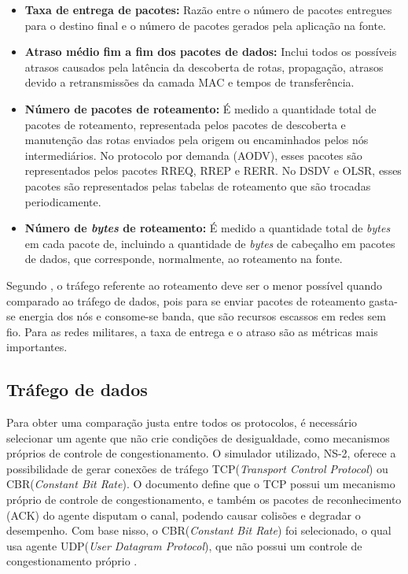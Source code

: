 \begin{itemize}
	\item \textbf{Taxa de entrega de pacotes:} Raz\~ao entre o n\'umero de pacotes entregues para o destino final e o n\'umero de pacotes gerados pela aplica\c{c}\~ao na fonte.
	\item \textbf{Atraso m\'edio fim a fim dos pacotes de dados:} Inclui todos os poss\'iveis atrasos causados pela lat\^encia da descoberta de rotas, propaga\c{c}\~ao, atrasos devido a retransmiss\~oes da camada MAC e tempos de transfer\^encia.
	\item \textbf{N\'umero de pacotes de roteamento:} \'E medido a quantidade total de pacotes de roteamento, representada pelos pacotes de descoberta e manuten\c{c}\~ao das rotas enviados pela origem ou encaminhados pelos n\'os intermedi\'arios. No protocolo por demanda (AODV), esses pacotes s\~ao representados pelos pacotes RREQ, RREP e RERR. No DSDV e OLSR, esses pacotes s\~ao representados pelas tabelas de roteamento que s\~ao trocadas periodicamente.
	\item \textbf{N\'umero de \textit{bytes} de roteamento:} \'E medido a quantidade total de \textit{bytes} em cada pacote de, incluindo a quantidade de \textit{bytes} de cabe\c{c}alho em pacotes de dados, que corresponde, normalmente, ao roteamento na fonte.
\end{itemize}
Segundo \cite{pereira}, o tr\'afego referente ao roteamento deve ser o menor poss\'ivel quando comparado ao tr\'afego de dados, pois para se enviar pacotes de roteamento gasta-se energia dos n\'os e consome-se banda, que s\~ao recursos escassos em redes sem fio. 
Para as redes militares, a taxa de entrega e o atraso s\~ao as m\'etricas mais importantes.

\subsection{Tr\'afego de dados}\label{trafegoDados}
Para obter uma compara\c{c}\~ao justa entre todos os protocolos, \'e necess\'ario selecionar um agente que n\~ao crie condi\c{c}\~oes de desigualdade, como mecanismos pr\'oprios de controle de congestionamento.
O simulador utilizado, NS-2, oferece a possibilidade de gerar conex\~oes de tr\'afego TCP(\textit{Transport Control Protocol}) ou CBR(\textit{Constant Bit Rate}).
O documento \cite{rfc793} define que o TCP possui um mecanismo pr\'oprio de controle de congestionamento, e tamb\'em os pacotes de reconhecimento (ACK) do agente disputam o canal, podendo causar colis\~oes e degradar o desempenho.
Com base nisso, o CBR(\textit{Constant Bit Rate}) foi selecionado, o qual usa agente UDP(\textit{User Datagram Protocol}), que n\~ao possui um controle de congestionamento pr\'oprio \cite{rfc768}.


